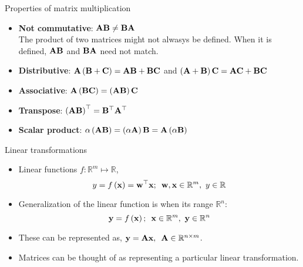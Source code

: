 \documentclass[aspectratio=169]{beamer}
\let\olditem\item
\renewcommand{\item}{\setlength{\itemsep}{\fill}\olditem}
\def\mf{\ensuremath\mathbf}
\begin{document}
\begin{frame}[t]{Properties of matrix multiplication}
\begin{itemize}
\item \textbf{Not commutative}: $\mf{A}\mf{B} \neq \mf{B}\mf{A}$\\
The product of two matrices might not alwasys be defined. When it is defined, $\mf{A}\mf{B}$ and $\mf{B}\mf{A}$ need not match.
\item \textbf{Distributive}:  $\mf{A}\left(\mf{B} + \mf{C}\right) = \mf{A}\mf{B} + \mf{B}\mf{C}$ and $\left(\mf{A} + \mf{B}\right)\mf{C} = \mf{A}\mf{C} + \mf{B}\mf{C}$ 
\item \textbf{Associative}: $\mf{A}\left(\mf{B}\mf{C}\right) = \left(\mf{A}\mf{B}\right)\mf{C} $
\item \textbf{Transpose}: $\left(\mf{A}\mf{B}\right)^{\top} = \mf{B}^{\top}\mf{A}^{\top}$
\item \textbf{Scalar product}: $\alpha\left(\mf{A}\mf{B}\right) = \left(\alpha \mf{A}\right)\mf{B} = \mf{A}\left(\alpha \mf{B}\right)$
\end{itemize}
\end{frame}


\begin{frame}[t]{Linear transformations}
  \begin{itemize}
      \item Linear functions $f: \mathbb{R}^m \mapsto \mathbb{R}$, 
      $$y = f\left(\mf{x}\right) = \mf{w}^{\top}\mf{x}; \,\,\, \mf{w}, \mf{x} \in \mathbb{R}^m, \,\, y \in \mathbb{R}$$
  
      \item Generalization of the linear function is when its range $\mathbb{R}^n$:
      $$\mf{y} = f\left(\mf{x}\right); \,\,\, \mf{x} \in \mathbb{R}^m, \,\, \mf{y} \in \mathbb{R}^n$$
  
      \item These can be represented as, $\mf{y} = \mf{Ax}, \,\,\, \mf{A} \in \mathbb{R}^{n \times m}$.\\
  
      \item Matrices can be thought of as representing a particular linear transformation.
  \end{itemize}
\end{frame}
\end{document}
